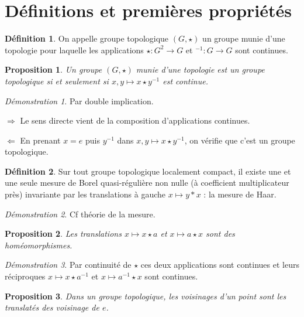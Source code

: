\documentclass[a4paper, 11pt, french]{book}
\newenvironment{itemise}{\itemize}{\enditemize}
\theoremstyle{plain} %
\newtheorem{proposition}{Proposition}
\theoremstyle{definition} %
\newtheorem{definition}{Définition}
\theoremstyle{remark} %
\newtheorem*{demonstration}{Démonstration}
\newcommand{\1}{\mathds{1}}
\newcommand{\inv}[1]{#1^{-1}}
\newcommand\equivalence[3]{
	\begin{demonstration}
		#1
		\begin{itemise}
			\item[$\Longrightarrow$] #2
			\item[$\Longleftarrow$] #3
		\end{itemise}
	\end{demonstration}
}
\begin{document}
\section{Définitions et premières propriétés}

\begin{definition}
	On appelle groupe topologique $(G, \star)$ un groupe munie d'une topologie pour laquelle les applications $\star:G^2\rightarrow G$ et $\inv{}:G\rightarrow G$ sont continues.
\end{definition}

\begin{proposition}
	Un groupe $(G, \star)$ munie d'une topologie est un groupe topologique si et seulement si $x, y\longmapsto x\star\inv{y}$ est continue.
\end{proposition}

\equivalence{Par double implication.}{
	Le sens directe vient de la composition d'applications continues.
}{
	En prenant $x=e$ puis $\inv{y}$ dans $x, y\longmapsto x\star\inv{y}$, on vérifie que c'est un groupe topologique.
}


\begin{definition}
	Sur tout groupe topologique localement compact, il existe une et une seule mesure de Borel quasi-régulière non nulle (à coefficient multiplicateur près) invariante par les translations à gauche $x\longmapsto y*x$ : la mesure de Haar.
\end{definition}

\begin{demonstration}
	Cf théorie de la mesure.
\end{demonstration}

\begin{proposition}
	Les translations $x\longmapsto x\star a$ et $x\longmapsto a\star x$ sont des homéomorphismes.
\end{proposition}

\begin{demonstration}
	Par continuité de $\star$ ces deux applications sont continues et leurs réciproques $x\longmapsto x\star\inv{a}$ et $x\longmapsto\inv{a}\star x$ sont continues.
\end{demonstration}

\begin{proposition}
	Dans un groupe topologique, les voisinages d’un point sont les translatés des voisinage de $e$.
\end{proposition}
\end{document}
